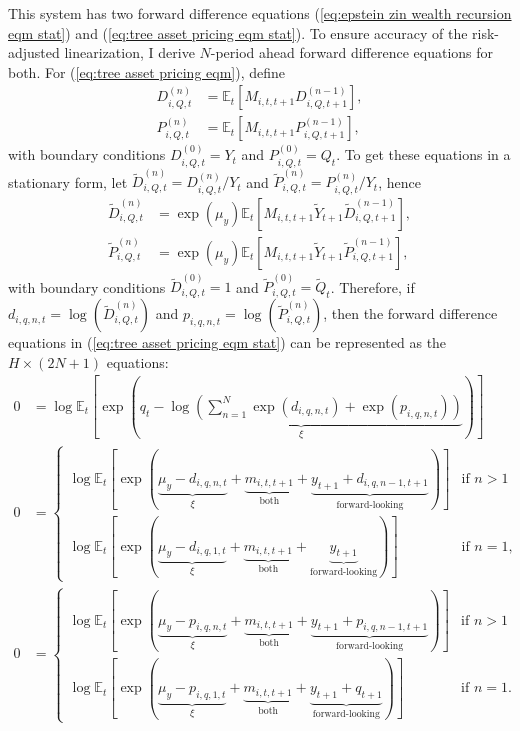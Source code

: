 \documentclass[12 pt, oneside]{article}
\theoremstyle{definition}
\theoremstyle{definition}
\theoremstyle{definition}
\newcommand{\E}{\mathbb{E}}
\begin{document}
This system has two forward difference equations (\ref{eq:epstein zin wealth recursion eqm stat}) and (\ref{eq:tree asset pricing eqm stat}). To ensure accuracy of the risk-adjusted linearization, I derive $N$-period ahead forward difference equations for both.
For (\ref{eq:tree asset pricing eqm}), define
\begin{align}
  D_{i, Q, t}^{(n)} & = \E_t[M_{i, t, t + 1} D_{i, Q, t + 1}^{(n - 1)}],\\
  P_{i, Q, t}^{(n)} & = \E_t[M_{i, t, t + 1} P_{i, Q, t + 1}^{(n - 1)}],
\end{align}
with boundary conditions $D_{i, Q, t}^{(0)} = Y_t$ and $P_{i, Q, t}^{(0)} = Q_t$. To get these equations in a stationary form, let $\tilde{D}_{i, Q, t}^{(n)} = D_{i, Q, t}^{(n)} / Y_t$ and $\tilde{P}_{i, Q, t}^{(n)} = P_{i, Q, t}^{(n)} / Y_t$, hence
\begin{align}
  \tilde{D}_{i, Q, t}^{(n)} & = \exp(\mu_y)\E_t[M_{i, t, t + 1} \tilde{Y}_{t + 1}\tilde{D}_{i, Q, t + 1}^{(n - 1)}],\\
  \tilde{P}_{i, Q, t}^{(n)} & = \exp(\mu_y)\E_t[M_{i, t, t + 1} \tilde{Y}_{t + 1}\tilde{P}_{i, Q, t + 1}^{(n - 1)}],
\end{align}
with boundary conditions $\tilde{D}_{i, Q, t}^{(0)} = 1$ and $\tilde{P}_{i, Q, t}^{(0)} = \tilde{Q}_t$.
Therefore, if $d_{i, q, n, t} = \log(\tilde{D}_{i, Q, t}^{(n)})$ and $p_{i, q, n, t} = \log(\tilde{P}_{i, Q, t}^{(n)})$, then the forward difference equations in (\ref{eq:tree asset pricing eqm stat}) can be represented as the $H \times (2N + 1)$ equations:
\begin{align}
  0 & = \log\E_t\left[\exp\left(\underbrace{q_t - \log\left(\sum_{n = 1}^{N}\exp(d_{i, q, n, t}) + \exp(p_{i, q, n, t})\right)}_{\xi}\right)\right]\\
  0 & =
      \begin{cases}
        \log\E_t\left[\exp\left(\underbrace{\mu_y - d_{i, q, n, t}}_{\xi} + \underbrace{m_{i, t, t + 1}}_{\text{both}} + \underbrace{y_{t + 1} +  d_{i, q, n - 1, t + 1}}_{\text{forward-looking}}\right)\right] & \text{if } n > 1\\
        \log\E_t\left[\exp\left(\underbrace{\mu_y - d_{i, q, 1, t}}_{\xi} + \underbrace{m_{i, t, t + 1}}_{\text{both}} + \underbrace{y_{t + 1}}_{\text{forward-looking}} \right)\right] & \text{if } n = 1,
      \end{cases}\\
  0 & =
      \begin{cases}
        \log\E_t\left[\exp\left(\underbrace{\mu_y - p_{i, q, n, t}}_{\xi} + \underbrace{m_{i, t, t + 1}}_{\text{both}} + \underbrace{y_{t + 1} + p_{i, q, n - 1, t + 1}}_{\text{forward-looking}} \right)\right] & \text{if } n > 1\\
        \log\E_t\left[\exp\left(\underbrace{\mu_y - p_{i, q, 1, t}}_{\xi} + \underbrace{m_{i, t, t + 1}}_{\text{both}} + \underbrace{y_{t + 1} + q_{t + 1}}_{\text{forward-looking}}\right)\right] & \text{if }n = 1.
      \end{cases}
\end{align}
\end{document}
